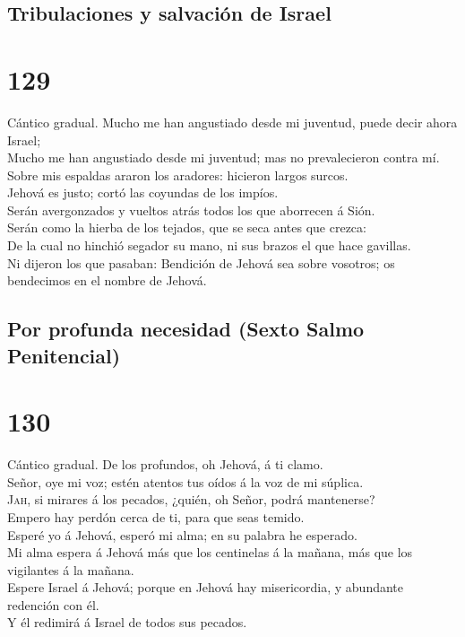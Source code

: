 \hypertarget{tribulaciones-y-salvaciuxf3n-de-israel}{%
\subsection{Tribulaciones y salvación de
Israel}\label{tribulaciones-y-salvaciuxf3n-de-israel}}

\hypertarget{section-19-129}{%
\section{129}\label{section-19-129}}

 Cántico gradual. Mucho me han angustiado desde mi
juventud, puede decir ahora Israel;\\
 Mucho me han angustiado desde mi juventud; mas no
prevalecieron contra mí.\\
 Sobre mis espaldas araron los aradores: hicieron largos
surcos.\\
 Jehová es justo; cortó las coyundas de los impíos.\\
 Serán avergonzados y vueltos atrás todos los que
aborrecen á Sión.\\
 Serán como la hierba de los tejados, que se seca antes
que crezca:\\
 De la cual no hinchió segador su mano, ni sus brazos el
que hace gavillas.\\
 Ni dijeron los que pasaban: Bendición de Jehová sea sobre
vosotros; os bendecimos en el nombre de Jehová.

\hypertarget{por-profunda-necesidad-sexto-salmo-penitencial}{%
\subsection{Por profunda necesidad (Sexto Salmo
Penitencial)}\label{por-profunda-necesidad-sexto-salmo-penitencial}}

\hypertarget{section-19-130}{%
\section{130}\label{section-19-130}}

 Cántico gradual. De los profundos, oh Jehová, á ti
clamo.\\
 Señor, oye mi voz; estén atentos tus oídos á la voz de mi
súplica.\\
 \textsc{Jah}, si mirares á los pecados, ¿quién, oh Señor,
podrá mantenerse?\\
 Empero hay perdón cerca de ti, para que seas temido.\\
 Esperé yo á Jehová, esperó mi alma; en su palabra he
esperado.\\
 Mi alma espera á Jehová más que los centinelas á la
mañana, más que los vigilantes á la mañana.\\
 Espere Israel á Jehová; porque en Jehová hay
misericordia, y abundante redención con él.\\
 Y él redimirá á Israel de todos sus pecados.

